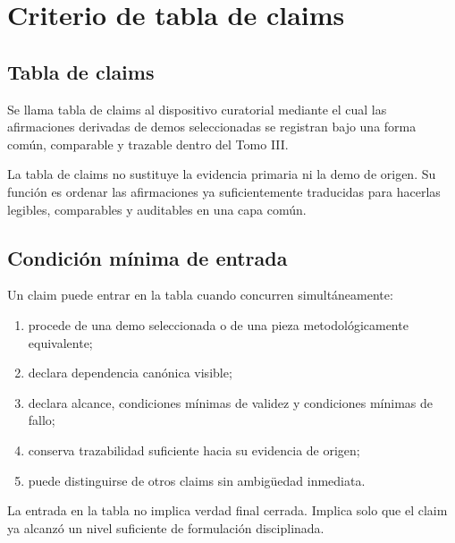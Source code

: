 \chapter{Criterio de tabla de claims}

\section{Tabla de claims}
\begin{definition}
Se llama tabla de claims al dispositivo curatorial mediante el cual las afirmaciones derivadas de demos seleccionadas se registran bajo una forma común, comparable y trazable dentro del Tomo III.
\end{definition}

\begin{observation}
La tabla de claims no sustituye la evidencia primaria ni la demo de origen. Su función es ordenar las afirmaciones ya suficientemente traducidas para hacerlas legibles, comparables y auditables en una capa común.
\end{observation}

\section{Condición mínima de entrada}
\begin{definition}
Un claim puede entrar en la tabla cuando concurren simultáneamente:
\begin{enumerate}
  \item procede de una demo seleccionada o de una pieza metodológicamente equivalente;
  \item declara dependencia canónica visible;
  \item declara alcance, condiciones mínimas de validez y condiciones mínimas de fallo;
  \item conserva trazabilidad suficiente hacia su evidencia de origen;
  \item puede distinguirse de otros claims sin ambigüedad inmediata.
\end{enumerate}
\end{definition}

\begin{observation}
La entrada en la tabla no implica verdad final cerrada. Implica solo que el claim ya alcanzó un nivel suficiente de formulación disciplinada.
\end{observation}

